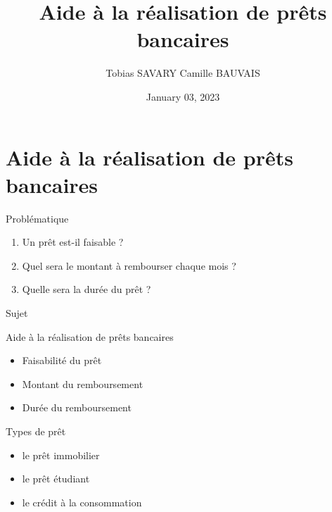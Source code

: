 \documentclass[
  ignorenonframetext,
]{beamer}
\title{Aide à la réalisation de prêts bancaires}
\author{Tobias SAVARY \textbar{} Camille BAUVAIS}
\date{January 03, 2023}
\providecommand{\tightlist}{%
  \setlength{\itemsep}{0pt}\setlength{\parskip}{0pt}}
\begin{document}
\frame{\titlepage}

\hypertarget{aide-uxe0-la-ruxe9alisation-de-pruxeats-bancaires}{%
\section{Aide à la réalisation de prêts
bancaires}\label{aide-uxe0-la-ruxe9alisation-de-pruxeats-bancaires}}

\begin{frame}{Problématique}
\protect\hypertarget{probluxe9matique}{}
\begin{enumerate}
\tightlist
\item
  Un prêt est-il faisable ?
\item
  Quel sera le montant à rembourser chaque mois ?
\item
  Quelle sera la durée du prêt ?
\end{enumerate}
\end{frame}

\begin{frame}{Sujet}
\protect\hypertarget{sujet}{}
\begin{block}{Aide à la réalisation de prêts bancaires}
\protect\hypertarget{aide-uxe0-la-ruxe9alisation-de-pruxeats-bancaires-1}{}
\begin{itemize}
\tightlist
\item
  Faisabilité du prêt
\item
  Montant du remboursement
\item
  Durée du remboursement
\end{itemize}
\end{block}

\begin{block}{Types de prêt}
\protect\hypertarget{types-de-pruxeat}{}
\begin{itemize}
\tightlist
\item
  le prêt immobilier
\item
  le prêt étudiant
\item
  le crédit à la consommation
\end{itemize}
\end{block}
\end{frame}
\end{document}
